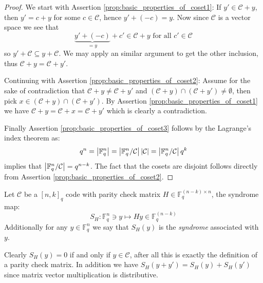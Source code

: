 \begin{proof}
  We start with Assertion \ref{prop:basic_properties_of_coset1}:
  If $y' \in \mathcal{C} + y$, then $y' = c + y$ for some $c \in \mathcal{C}$, hence $y' + (-c) = y$. Now since $\mathcal{C}$ is a vector space we see that
  \begin{equation*}
   \underset{=y}{\underbrace{y' + (-c)}} + c' \in \mathcal{C} + y \text{ for all } c' \in \mathcal{C}
  \end{equation*}
  so $y' + \mathcal{C} \subseteq y + \mathcal{C}$. We may apply an similar argument to get the other inclusion, thus $\mathcal{C} + y = \mathcal{C} + y'$.

  Continuing with Assertion \ref{prop:basic_properties_of_coset2}: Assume for the sake of contradiction that $\mathcal{C} + y \neq \mathcal{C} + y'$ and $(\mathcal{C} + y) \cap (\mathcal{C} + y') \neq \emptyset$, then pick $x \in (\mathcal{C} + y) \cap (\mathcal{C} + y')$. By Assertion \ref{prop:basic_properties_of_coset1} we have $\mathcal{C} + y = \mathcal{C}  + x = \mathcal{C} + y'$ which is clearly a contradiction.

  Finally Assertion \ref{prop:basic_properties_of_coset3} follows by the Lagrange's index theorem as:
  \begin{equation*}
    q^{n} = \left\lvert\mathbb{F}_q^n\right\rvert = \left\lvert\mathbb{F}_q^{n} / \mathcal{C}\right\rvert\left\lvert\mathcal{C}\right\rvert = \left\lvert\mathbb{F}_q^n / \mathcal{C}\right\rvert q^{k}
  \end{equation*}
  implies that $\left\lvert\mathbb{F}_q^n / \mathcal{C}\right\rvert = q^{n - k}$. The fact that the cosets are disjoint follows directly from Assertion \ref{prop:basic_properties_of_coset2}.
\end{proof}

\begin{definition}
  Let $\mathcal{C}$ be a $[n, k]_{q}$ code with parity check matrix $H \in \mathbb{F}_q^{(n - k) \times n}$, the syndrome map:
  \begin{equation*}
    S_H: \mathbb{F}_q^n \ni y \mapsto H y \in \mathbb{F}_q^{(n - k)}
  \end{equation*}
  Additionally for any $y \in \mathbb{F}_q^n$ we say that $S_H(y)$ is the \textit{syndrome} associated with $y$.
\end{definition}

\begin{remark}\label{rem:basic_properties}
  Clearly $S_H(y) = 0$ if and only if $y \in \mathcal{C}$, after all this is exactly the definition of a parity check matrix. In addition we have $S_H(y + y') = S_H(y) + S_H(y')$ since matrix vector multiplication is distributive.
\end{remark}

